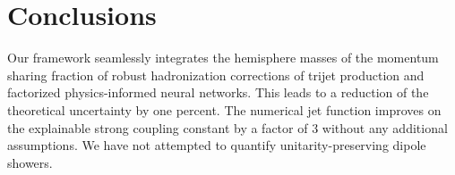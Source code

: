 \section{Conclusions}\label{sec:conclusions}

Our framework seamlessly integrates the hemisphere masses of the
momentum sharing fraction of robust hadronization corrections of trijet
production and factorized physics-informed neural networks. This leads
to a reduction of the theoretical uncertainty by one percent. The
numerical jet function improves on the explainable strong coupling
constant by a factor of 3 without any additional assumptions. We have
not attempted to quantify unitarity-preserving dipole showers.

